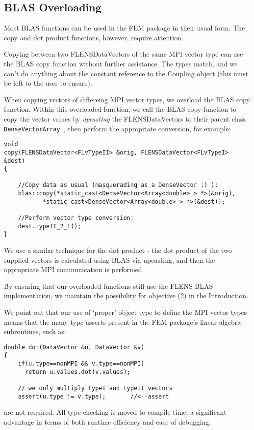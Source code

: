 \subsection{BLAS Overloading}

Most BLAS functions can be used in the FEM package in their usual form. The copy and dot product functions, however, require attention.

Copying between two FLENSDataVectors of the same MPI vector type can use the BLAS copy function without further assistance. The types match, and we can't do anything about the constant reference to the Coupling object (this must be left to the user to ensure). 

When copying vectors of differeing MPI vector types, we overload the BLAS copy function. Within this overloaded function, we call the BLAS copy function to copy the vector values by \emph{upcasting} the FLENSDataVectors to their parent class \texttt{DenseVector\<Array\<\double\> \>}, then perform the appropriate conversion, for example:
\begin{lstlisting}
void
copy(FLENSDataVector<FLvTypeII> &orig, FLENSDataVector<FLvTypeI> &dest) 
{

	//Copy data as usual (masquerading as a DenseVector :) ):
	blas::copy(*static_cast<DenseVector<Array<double> > *>(&orig),
		   *static_cast<DenseVector<Array<double> > *>(&dest));

	//Perform vector type conversion:
	dest.typeII_2_I();
}
\end{lstlisting}

We use a similar technique for the dot product - the dot product of the two supplied vectors is calculated using BLAS via upcasting, and then the appropriate MPI communication is performed.

By ensuring that our overloaded functions still use the FLENS BLAS implementation, we maintain the possibility for objective (2) in the Introduction.

We point out that our use of `proper' object type to define the MPI vector types means that the many type asserts present in the FEM package's linear algebra subroutines, such as:
\begin{lstlisting}
double dot(DataVector &u, DataVector &v)
{
	if(u.type==nonMPI && v.type==nonMPI) 
	  return u.values.dot(v.values);
	
	// we only multiply typeI and typeII vectors
	assert(u.type != v.type);		//<--assert
\end{lstlisting}
are not required. All type checking is moved to compile time, a significant advantage in terms of both runtime efficiency and ease of debugging.

